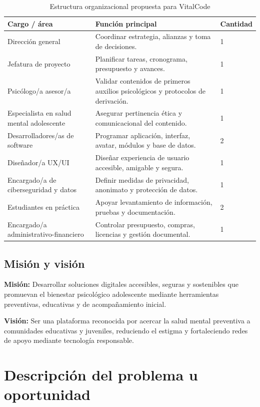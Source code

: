 \documentclass[12pt,letterpaper]{article}
\begin{document}
\begin{table}[H]
\centering
\caption{Estructura organizacional propuesta para VitalCode}
\begin{tabularx}{\textwidth}{p{4cm} X p{2.2cm}}
\toprule
\textbf{Cargo / área} & \textbf{Función principal} & \textbf{Cantidad} \\
\midrule
Dirección general & Coordinar estrategia, alianzas y toma de decisiones. & 1 \\
Jefatura de proyecto & Planificar tareas, cronograma, presupuesto y avances. & 1 \\
Psicólogo/a asesor/a & Validar contenidos de primeros auxilios psicológicos y protocolos de derivación. & 1 \\
Especialista en salud mental adolescente & Asegurar pertinencia ética y comunicacional del contenido. & 1 \\
Desarrolladores/as de software & Programar aplicación, interfaz, avatar, módulos y base de datos. & 2 \\
Diseñador/a UX/UI & Diseñar experiencia de usuario accesible, amigable y segura. & 1 \\
Encargado/a de ciberseguridad y datos & Definir medidas de privacidad, anonimato y protección de datos. & 1 \\
Estudiantes en práctica & Apoyar levantamiento de información, pruebas y documentación. & 2 \\
Encargado/a administrativo-financiero & Controlar presupuesto, compras, licencias y gestión documental. & 1 \\
\bottomrule
\end{tabularx}
\end{table}

\subsection{Misión y visión}
\textbf{Misión:} Desarrollar soluciones digitales accesibles, seguras y sostenibles que promuevan el bienestar psicológico adolescente mediante herramientas preventivas, educativas y de acompañamiento inicial.

\textbf{Visión:} Ser una plataforma reconocida por acercar la salud mental preventiva a comunidades educativas y juveniles, reduciendo el estigma y fortaleciendo redes de apoyo mediante tecnología responsable.

\section{Descripción del problema u oportunidad}
\end{document}
